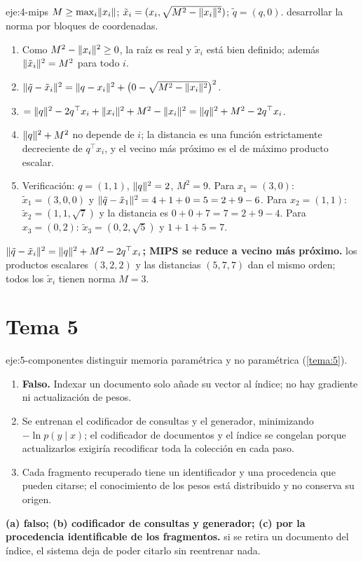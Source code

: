 \begin{solucion}{eje:4-mips}
\datos $M\ge\max_i\lVert x_i\rVert$; $\tilde x_i=(x_i,\sqrt{M^{2}-\lVert x_i\rVert^{2}})$; $\tilde q=(q,0)$.
\planteamiento desarrollar la norma por bloques de coordenadas.
\pasos
\begin{enumerate}[label=\arabic*.]
  \item Como $M^{2}-\lVert x_i\rVert^{2}\ge 0$, la raíz es real y $\tilde x_i$ está bien definido; además $\lVert\tilde x_i\rVert^{2}=M^{2}$ para todo $i$.
  \item $\lVert\tilde q-\tilde x_i\rVert^{2}=\lVert q-x_i\rVert^{2}+\bigl(0-\sqrt{M^{2}-\lVert x_i\rVert^{2}}\bigr)^{2}$.
  \item $=\lVert q\rVert^{2}-2q^{\top}x_i+\lVert x_i\rVert^{2}+M^{2}-\lVert x_i\rVert^{2}=\lVert q\rVert^{2}+M^{2}-2q^{\top}x_i$.
  \item $\lVert q\rVert^{2}+M^{2}$ no depende de $i$; la distancia es una función estrictamente decreciente de $q^{\top}x_i$, y el vecino más próximo es el de máximo producto escalar.
  \item Verificación: $q=(1,1)$, $\lVert q\rVert^{2}=2$, $M^{2}=9$. Para $x_1=(3,0)$: $\tilde x_1=(3,0,0)$ y $\lVert\tilde q-\tilde x_1\rVert^{2}=4+1+0=5=2+9-6$. Para $x_2=(1,1)$: $\tilde x_2=(1,1,\sqrt7)$ y la distancia es $0+0+7=7=2+9-4$. Para $x_3=(0,2)$: $\tilde x_3=(0,2,\sqrt5)$ y $1+1+5=7$.
\end{enumerate}
\resultado \textbf{$\lVert\tilde q-\tilde x_i\rVert^{2}=\lVert q\rVert^{2}+M^{2}-2q^{\top}x_i$; MIPS se reduce a vecino más próximo.}
\comprobacion los productos escalares $(3,2,2)$ y las distancias $(5,7,7)$ dan el mismo orden; todos los $\tilde x_i$ tienen norma $M=3$.
\end{solucion}

\section{Tema 5}

\begin{solucion}{eje:5-componentes}
\planteamiento distinguir memoria paramétrica y no paramétrica (\cref{tema:5}).
\pasos
\begin{enumerate}[label=(\alph*)]
  \item \textbf{Falso.} Indexar un documento solo añade su vector al índice; no hay gradiente ni actualización de pesos.
  \item Se entrenan el codificador de consultas y el generador, minimizando $-\ln p(y\mid x)$; el codificador de documentos y el índice se congelan porque actualizarlos exigiría recodificar toda la colección en cada paso.
  \item Cada fragmento recuperado tiene un identificador y una procedencia que pueden citarse; el conocimiento de los pesos está distribuido y no conserva su origen.
\end{enumerate}
\resultado \textbf{(a) falso; (b) codificador de consultas y generador; (c) por la procedencia identificable de los fragmentos.}
\comprobacion si se retira un documento del índice, el sistema deja de poder citarlo sin reentrenar nada.
\end{solucion}

